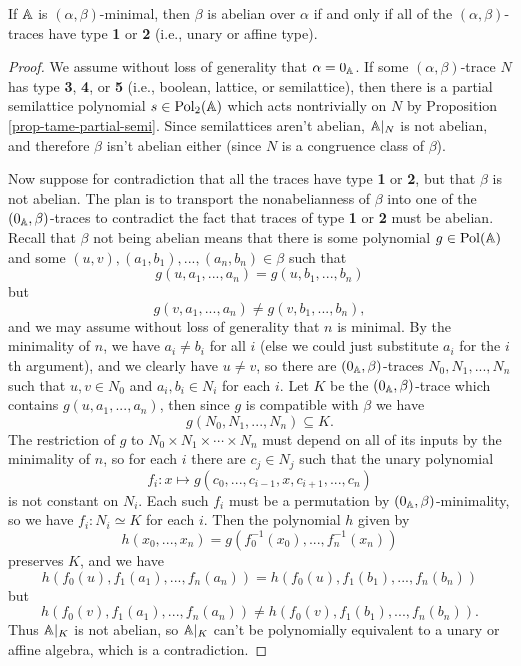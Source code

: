 \begin{appendices}
\begin{prop}\label{prop-abelian-minimal-set} If $\mathbb{A}$ is $(\alpha,\beta)$-minimal, then $\beta$ is abelian over $\alpha$ if and only if all of the $(\alpha,\beta)$-traces have type \textbf{1} or \textbf{2} (i.e., unary or affine type).
\end{prop}
\begin{proof} We assume without loss of generality that $\alpha = 0_{\mathbb{A}}$. If some $(\alpha,\beta)$-trace $N$ has type \textbf{3}, \textbf{4}, or \textbf{5} (i.e., boolean, lattice, or semilattice), then there is a partial semilattice polynomial $s \in \operatorname{Pol}_2(\mathbb{A})$ which acts nontrivially on $N$ by Proposition \ref{prop-tame-partial-semi}. Since semilattices aren't abelian, $\mathbb{A}|_N$ is not abelian, and therefore $\beta$ isn't abelian either (since $N$ is a congruence class of $\beta$).

Now suppose for contradiction that all the traces have type \textbf{1} or \textbf{2}, but that $\beta$ is not abelian. The plan is to transport the nonabelianness of $\beta$ into one of the $(0_{\mathbb{A}},\beta)$-traces to contradict the fact that traces of type \textbf{1} or \textbf{2} must be abelian. Recall that $\beta$ not being abelian means that there is some polynomial $g \in \operatorname{Pol}(\mathbb{A})$ and some $(u,v), (a_1,b_1), ..., (a_n,b_n) \in \beta$ such that
\[
g(u,a_1,...,a_n) = g(u,b_1,...,b_n)
\]
but
\[
g(v,a_1,...,a_n) \ne g(v,b_1,...,b_n),
\]
and we may assume without loss of generality that $n$ is minimal. By the minimality of $n$, we have $a_i \ne b_i$ for all $i$ (else we could just substitute $a_i$ for the $i$th argument), and we clearly have $u \ne v$, so there are $(0_{\mathbb{A}},\beta)$-traces $N_0, N_1, ..., N_n$ such that $u,v \in N_0$ and $a_i,b_i \in N_i$ for each $i$. Let $K$ be the $(0_{\mathbb{A}},\beta)$-trace which contains $g(u,a_1,...,a_n)$, then since $g$ is compatible with $\beta$ we have
\[
g(N_0,N_1, ..., N_n) \subseteq K.
\]
The restriction of $g$ to $N_0\times N_1 \times \cdots \times N_n$ must depend on all of its inputs by the minimality of $n$, so for each $i$ there are $c_j \in N_j$ such that the unary polynomial
\[
f_i : x \mapsto g(c_0,...,c_{i-1},x,c_{i+1},...,c_n)
\]
is not constant on $N_i$. Each such $f_i$ must be a permutation by $(0_{\mathbb{A}},\beta)$-minimality, so we have $f_i : N_i \simeq K$ for each $i$. Then the polynomial $h$ given by
\[
h(x_0,...,x_n) = g(f_0^{-1}(x_0), ..., f_n^{-1}(x_n))
\]
preserves $K$, and we have
\[
h(f_0(u), f_1(a_1), ..., f_n(a_n)) = h(f_0(u), f_1(b_1), ..., f_n(b_n))
\]
but
\[
h(f_0(v), f_1(a_1), ..., f_n(a_n)) \ne h(f_0(v), f_1(b_1), ..., f_n(b_n)).
\]
Thus $\mathbb{A}|_K$ is not abelian, so $\mathbb{A}|_K$ can't be polynomially equivalent to a unary or affine algebra, which is a contradiction.
\end{proof}


\end{appendices}
